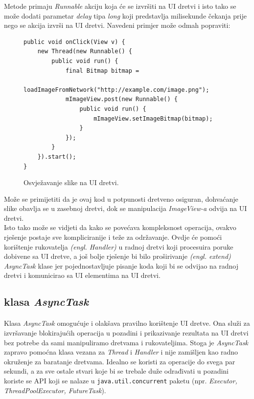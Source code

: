 \documentclass[times, utf8, zavrsni]{fer}
\begin{document}
Metode primaju \textit{Runnable} akciju koja će se izvršiti na UI dretvi i isto tako se može dodati parametar \textit{delay} tipa \textit{long} koji predstavlja milisekunde čekanja prije nego se akcija izvrši na UI dretvi.\newpage 
Navedeni primjer može odmah popraviti:

\begin{figure}[ht!]
\begin{lstlisting}
public void onClick(View v) {
    new Thread(new Runnable() {
        public void run() {
            final Bitmap bitmap =
                    loadImageFromNetwork("http://example.com/image.png");
            mImageView.post(new Runnable() {
                public void run() {
                    mImageView.setImageBitmap(bitmap);
                }
            });
        }
    }).start();
}
\end{lstlisting}
\caption{Osvježavanje slike na UI dretvi.}
\label{overflow}
\end{figure}

Može se primijetiti da je ovaj kod u potpunosti dretveno osiguran, dohvaćanje slike obavlja se u zasebnoj dretvi, dok se manipulacija \textit{ImageView-a} odvija na UI dretvi.\\

Isto tako može se vidjeti da kako se povećava kompleksnost operacija, ovakvo rješenje postaje sve kompliciranije i teže za održavanje. Ovdje će pomoći korištenje rukovatelja \textit{(engl. Handler)} u radnoj dretvi koji procesuira poruke dobivene sa UI dretve, a još bolje rješenje bi bilo proširivanje \textit{(engl. extend)} \textit{AsyncTask} klase jer pojednostavljuje pisanje koda koji bi se odvijao na radnoj dretvi i komunicirao sa UI elementima na UI dretvi.

\subsection{klasa \textit{AsyncTask}}
\paragraph{}
Klasa \textit{AsyncTask} omogućuje i olakšava pravilno korištenje UI dretve. Ona služi za izvršavanje blokirajućih operacija u pozadini i prikazivanje rezultata na UI dretvi bez potrebe da sami manipuliramo dretvama i rukovateljima. Stoga je \textit{AsyncTask} zapravo pomoćna klasa vezana za \textit{Thread} i \textit{Handler} i nije zamišljen kao radno okruženje za baratanje dretvama. Idealno se koristi za operacije do svega par sekundi, a za sve ostale stvari koje bi se trebale duže odrađivati u pozadini koriste se API koji se nalaze u \verb|java.util.concurrent| paketu (npr. \textit{Executor, ThreadPoolExecutor, FutureTask}).\\
\end{document}
